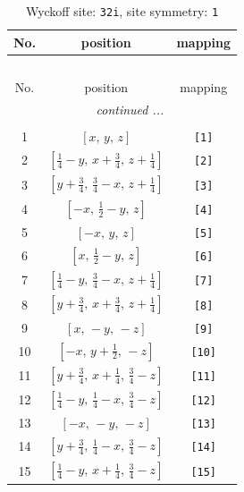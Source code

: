 \documentclass[fleqn,8pt]{jsarticle}
\begin{document}
\renewcommand{\arraystretch}{1.2}
\begin{longtable}{ccc}
\caption{Wyckoff site: {\tt 32i}, site symmetry: {\tt 1}}
 \\
 \hline \hline
No. & position & mapping \\ \hline \endfirsthead

\multicolumn{2}{l}{\tablename\ \thetable{}} \\
 \hline \hline
No. & position & mapping \\ \hline \endhead

 \hline \hline
\multicolumn{2}{r}{\footnotesize\it continued ...} \\ \endfoot

 \hline \hline
\multicolumn{2}{r}{} \\ \endlastfoot

1 & $\left[ x,\, y,\, z \right]$ & {\tt [1]} \\ \hline
2 & $\left[ \frac{1}{4} - y,\, x + \frac{3}{4},\, z + \frac{1}{4} \right]$ & {\tt [2]} \\ \hline
3 & $\left[ y + \frac{3}{4},\, \frac{3}{4} - x,\, z + \frac{1}{4} \right]$ & {\tt [3]} \\ \hline
4 & $\left[ - x,\, \frac{1}{2} - y,\, z \right]$ & {\tt [4]} \\ \hline
5 & $\left[ - x,\, y,\, z \right]$ & {\tt [5]} \\ \hline
6 & $\left[ x,\, \frac{1}{2} - y,\, z \right]$ & {\tt [6]} \\ \hline
7 & $\left[ \frac{1}{4} - y,\, \frac{3}{4} - x,\, z + \frac{1}{4} \right]$ & {\tt [7]} \\ \hline
8 & $\left[ y + \frac{3}{4},\, x + \frac{3}{4},\, z + \frac{1}{4} \right]$ & {\tt [8]} \\ \hline
9 & $\left[ x,\, - y,\, - z \right]$ & {\tt [9]} \\ \hline
10 & $\left[ - x,\, y + \frac{1}{2},\, - z \right]$ & {\tt [10]} \\ \hline
11 & $\left[ y + \frac{3}{4},\, x + \frac{1}{4},\, \frac{3}{4} - z \right]$ & {\tt [11]} \\ \hline
12 & $\left[ \frac{1}{4} - y,\, \frac{1}{4} - x,\, \frac{3}{4} - z \right]$ & {\tt [12]} \\ \hline
13 & $\left[ - x,\, - y,\, - z \right]$ & {\tt [13]} \\ \hline
14 & $\left[ y + \frac{3}{4},\, \frac{1}{4} - x,\, \frac{3}{4} - z \right]$ & {\tt [14]} \\ \hline
15 & $\left[ \frac{1}{4} - y,\, x + \frac{1}{4},\, \frac{3}{4} - z \right]$ & {\tt [15]} \\ \hline

\end{longtable}
\end{document}
